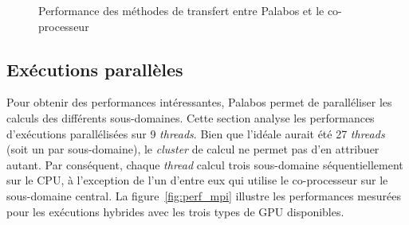 \begin{figure}[h]
	\centering
	\caption{Performance des méthodes de transfert entre Palabos et le co-processeur}
	\label{fig:trsf_methods}
\end{figure}

\subsection{Exécutions parallèles}
Pour obtenir des performances intéressantes, Palabos permet de paralléliser les calculs des différents sous-domaines. Cette section analyse les performances d'exécutions parallélisées sur 9 \textit{threads}. Bien que l'idéale aurait été 27 \textit{threads} (soit un par sous-domaine), le \textit{cluster} de calcul ne permet pas d'en attribuer autant. Par conséquent, chaque \textit{thread} calcul trois sous-domaine séquentiellement sur le \acs{CPU}, à l'exception de l'un d'entre eux qui utilise le co-processeur sur le sous-domaine central. La figure~\ref{fig:perf_mpi} illustre les performances mesurées pour les exécutions hybrides avec les trois types de \acs{GPU} disponibles.

